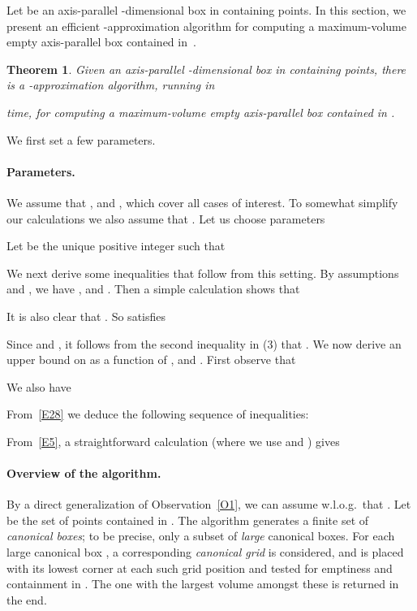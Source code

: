 \documentclass[11pt]{article}
\newtheorem{theorem}{Theorem}
\begin{document}
Let  be an axis-parallel -dimensional box in  
containing  points. In this section, we present an efficient
-approximation algorithm for computing a maximum-volume
empty axis-parallel box contained in~. 

\begin{theorem} \label{T4}
Given an axis-parallel -dimensional box  in  containing
 points, there is a -approximation algorithm, running in  

time, for computing a maximum-volume empty axis-parallel box
contained in . 
\end{theorem}


We first set a few parameters. 


\paragraph {Parameters.}

We assume that , and , 
which cover all cases of interest. To somewhat simplify our
calculations we also assume that . Let us choose parameters
 
Let  be the unique positive integer such that
 


We next derive some inequalities that follow from this setting.
By assumptions  and ,
we have ,
and .  Then a simple calculation shows
that 
 

It is also clear that .
So  satisfies
 
Since  and , it follows from the
second inequality in (3) that . 
We now derive an upper bound on  as a function of ,  and
. First observe that 

We also have 

From~\eqref{E28} we deduce the following sequence of inequalities: 
 


From~\eqref{E5}, a straightforward calculation 
(where we use  and ) gives
 


\paragraph{Overview of the algorithm.}
By a direct generalization of Observation~\ref{O1}, we can assume w.l.o.g.\  
that . Let  be the set of  points contained in .
The algorithm generates a finite set  of {\em canonical boxes};
to be precise, only a subset of {\em large} canonical boxes.
For each large canonical box , a corresponding {\em
canonical grid} is considered, and  is placed with its lowest
corner at each such grid position and tested for emptiness and containment in . 
The one with the largest volume amongst these is returned in the end. 
\end{document}

